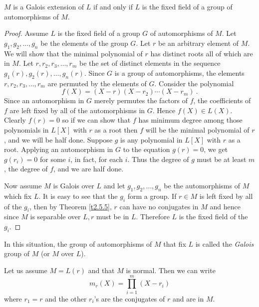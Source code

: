 \begin{theo}
\label{t2.5.6}
$M$ is a Galois extension of $L$ if and only if $L$ is the fixed field of a group of automorphisms of $M$.
\end{theo}

\begin{proof}
Assume $L$ is the fixed field of a group $G$ of automorphisms of $M$. Let $g_{1},g_{2},\ldots,g_{n}$ be the elements of the group $G$. Let $r$ be an arbitrary element of $M$. We will show that the minimal polynomial of $r$ has distinct roots all of which are in $M$. Let $r,r_{2},r_{3},\ldots,r_{m}$ be the set of distinct elements in the sequence $g_{1}(r),g_{2}(r),\ldots,g_{n}(r)$. Since $G$ is a group of automorphisms, the elements $r,r_{2},r_{3}, \ldots, r_{m}$ are permuted by the elements of $G$. Consider the polynomial
$$
f(X)=(X-r)(X-r_{2})\cdots(X-r_{m})\ .
$$
Since an automorphism in $G$ merely permutes the factors of $f$, the coefficients of $f$ are left fixed by all of the automorphisms in $G$. Hence $f(X)\in L(X)$. Clearly $f(r)=0$ so if we can show that $f$ has minimum degree among those polynomials in $L[X]$ with $r$ as a root then $f$ will be the minimal polynomial of $r$, and we will be half done. Suppose $g$ is any polynomial in $L[X]$ with $r$ as a root. Applying an automorphism in $G$ to the equation $g(r)=0$, we get $g(r_{i})=0$ for some $i$, in fact, for each $i$. Thus the degree of $g$ must be at least $m$, the degree of $f$, and we are half done.

Now assume $M$ is Galois over $L$ and let $g_{1},g_{2}, \ldots, g_{n}$ be the automorphisms of $M$ which fix $L$. It is easy to see that the $g_{i}$ form a group. If $r\in M$ is left fixed by all of the $g_{i}$, then by Theorem \ref{t2.5.5}, $r$ can have no conjugates in $M$ and hence since $M$ is separable over $L,r$ must be in $L$. Therefore $L$ is the fixed field of the $g_{i}$.
\end{proof}
In this situation, the group of automorphisms of $M$ that fix $L$ is called the {\it Galois} group of $M$ (or $M$ over $L$).

Let us assume $M=L(r)$ and that $M$ is normal. Then we can write
$$
m_{r}(X)=\prod_{i=1}^{m}(X-r_{i})
$$
where $r_{1}=r$ and the other $r_{i}$'s are the conjugates of $r$ and are in $M$.

